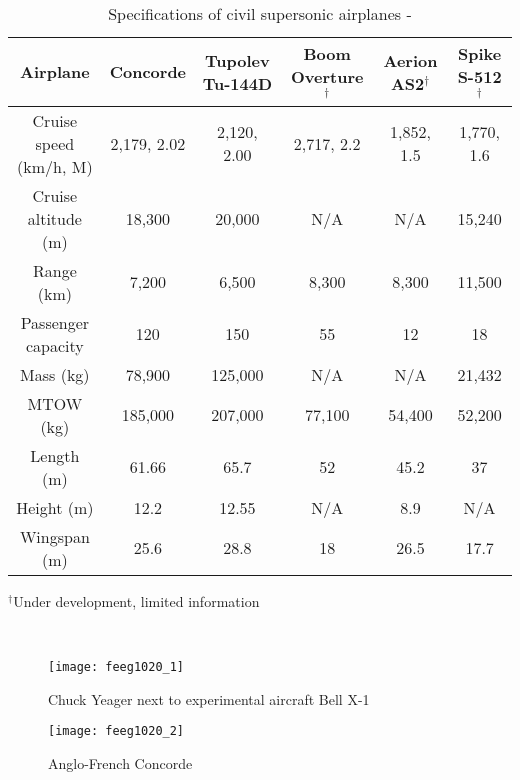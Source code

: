 \documentclass[a4paper,11pt]{article}
\begin{document}
\vspace*{\fill}
\begin{table}[h!]
\hspace{-0.65cm}
\begin{tabular}{| c || c | c | c | c | c |}
\hline
Airplane & Concorde & Tupolev Tu-144D & Boom Overture$^\dagger$ & Aerion AS2$^\dagger$ & Spike S-512$^\dagger$ \\
\hline
Cruise speed (km/h, M) & 2,179, 2.02 & 2,120, 2.00 & 2,717, 2.2 & 1,852, 1.5 & 1,770, 1.6 \\
\hline
Cruise altitude (m) & 18,300 & 20,000 & N/A & N/A & 15,240 \\  
\hline
Range (km) & 7,200 & 6,500 & 8,300 & 8,300 & 11,500 \\
\hline
Passenger capacity & 120 & 150 & 55 & 12 & 18 \\  
\hline
Mass (kg) & 78,900 & 125,000 & N/A & N/A & 21,432 \\
\hline
MTOW (kg) & 185,000 & 207,000 & 77,100 & 54,400 & 52,200 \\
\hline
Length (m) & 61.66 & 65.7 & 52 & 45.2 & 37 \\
\hline
Height (m) & 12.2 & 12.55 & N/A & 8.9 & N/A \\
\hline
Wingspan (m) & 25.6 & 28.8 & 18 & 26.5 & 17.7 \\
\hline
\end{tabular}
\begin{footnotesize}{$^\dagger$Under development, limited information}\end{footnotesize}
\caption{Specifications of civil supersonic airplanes \cite{tupolev} - \cite{spikeaero}}
\end{table}
\vspace*{\fill}

\newpage
\ \vspace{0.5cm}

\begin{figure}[h] 
\texttt{[image: feeg1020\_1]}
\centering
\caption{Chuck Yeager next to experimental aircraft Bell X-1 \cite{picture1}}
\end{figure}

\vspace{1cm}

\begin{figure}[h] 
\texttt{[image: feeg1020\_2]}
\centering
\caption{Anglo-French Concorde \cite{picture2}}
\end{figure}
\end{document}

